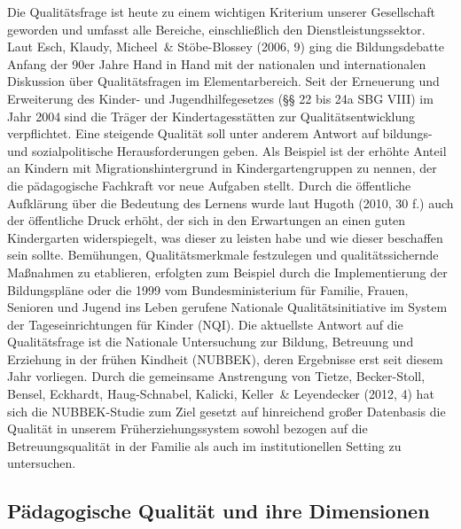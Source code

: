 Die Qualitätsfrage ist heute zu einem wichtigen Kriterium unserer Gesellschaft geworden und umfasst alle Bereiche, einschließlich den Dienstleistungssektor. Laut Esch, Klaudy, Micheel~\& Stöbe-Blossey (2006, 9) ging die Bildungsdebatte Anfang der 90er Jahre Hand in Hand mit der nationalen und internationalen Diskussion über Qualitätsfragen im Elementarbereich. Seit der Erneuerung und Erweiterung des Kinder- und Jugendhilfegesetzes (§§ 22 bis 24a SBG VIII) im Jahr 2004 sind die Träger der Kindertagesstätten zur Qualitätsentwicklung verpflichtet. Eine steigende Qualität soll unter anderem Antwort auf bildungs- und sozialpolitische Herausforderungen geben. Als Beispiel ist der erhöhte Anteil an Kindern mit Migrationshintergrund in Kindergartengruppen zu nennen, der die pädagogische Fachkraft vor neue Aufgaben stellt.
Durch die öffentliche Aufklärung über die Bedeutung des Lernens wurde laut Hugoth (2010, 30 f.) auch der öffentliche Druck erhöht, der sich in den Erwartungen an einen guten Kindergarten widerspiegelt, was dieser zu leisten habe und wie dieser beschaffen sein sollte. 
Bemühungen, Qualitätsmerkmale festzulegen und qualitätssichernde Maßnahmen zu etablieren, erfolgten zum Beispiel durch die Implementierung der Bildungspläne oder die 1999 vom Bundesministerium für Familie, Frauen, Senioren und Jugend ins Leben gerufene Nationale Qualitätsinitiative im System der Tageseinrichtungen für Kinder (NQI). 
Die aktuellste Antwort auf die Qualitätsfrage ist die Nationale Untersuchung zur Bildung, Betreuung und Erziehung in der frühen Kindheit (NUBBEK), deren Ergebnisse erst seit diesem Jahr vorliegen. Durch die gemeinsame Anstrengung von Tietze, Becker-Stoll, Bensel, Eckhardt, Haug-Schnabel, Kalicki, Keller~\& Leyendecker (2012, 4) hat sich die  NUBBEK-Studie zum Ziel gesetzt auf hinreichend großer Datenbasis die Qualität in unserem Früherziehungssystem sowohl bezogen auf die Betreuungsqualität in der Familie als auch im institutionellen Setting zu untersuchen. 
  
\subsection{Pädagogische Qualität und ihre Dimensionen}

